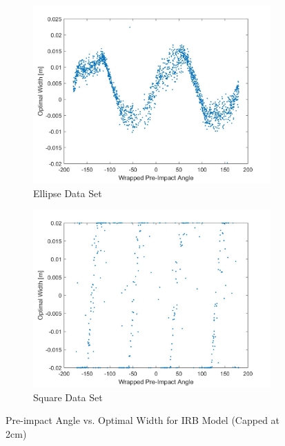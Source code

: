 \documentclass{article}
\begin{document}
\begin{figure}[h!]
    \centering
    \begin{subfigure}[b]{0.45\linewidth}
        \includegraphics[scale=0.125]{ellipseAngleWidth.jpg}
        \caption{Ellipse Data Set}
        \label{fig:ellipseAngleWidth}
    \end{subfigure}
    \quad
    \begin{subfigure}[b]{0.45\linewidth}
       \includegraphics[scale=0.125]{squareAngleWidth.jpg}
        \caption{Square Data Set}
        \label{fig:squareAngleWidth}
    \end{subfigure}
    \caption{Pre-impact Angle vs. Optimal Width for IRB Model (Capped at 2cm)}
\end{figure}
\end{document}
